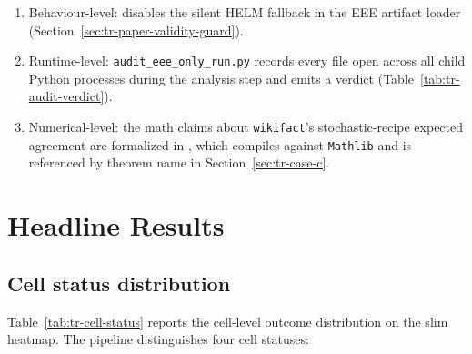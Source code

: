 \documentclass[11pt]{article}
\begin{document}
\begin{enumerate}
  \item Behaviour-level:  disables
        the silent HELM fallback in the EEE artifact loader
        (Section~\ref{sec:tr-paper-validity-guard}).
  \item Runtime-level: \texttt{audit\_eee\_only\_run.py} records every
        file open across all child Python processes during the
        analysis step and emits a verdict
        (Table~\ref{tab:tr-audit-verdict}).
  \item Numerical-level: the math claims about \texttt{wikifact}'s
        stochastic-recipe expected agreement are formalized in
        , which compiles
        against \texttt{Mathlib} and is referenced by theorem name in
        Section~\ref{sec:tr-case-c}.
\end{enumerate}


\section{Headline Results}
\label{sec:tr-headline}

\subsection{Cell status distribution}
\label{sec:tr-status-dist}

Table~\ref{tab:tr-cell-status} reports the cell-level outcome
  distribution on the slim heatmap.
The pipeline distinguishes four cell statuses:
\end{document}
